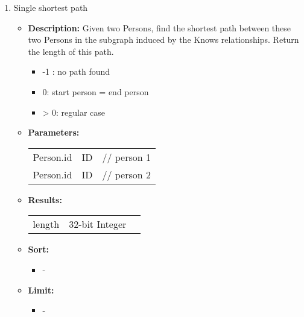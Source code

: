 {\begin{enumerate}
    \item Single shortest path
        \begin{itemize}
            \item \textbf{Description:}
                Given two Persons, find the shortest path between these two Persons in the subgraph induced by the Knows relationships.
                Return the length of this path.
                \begin{itemize}
                    \item -1 : no path found
                    \item 0: start person = end person
                    \item > 0: regular case
                \end{itemize}
            \item \textbf{Parameters:} \\
                \begin{tabular}{lll}
                    Person.id 	 			& ID & \parbox[t]{20cm}{// person 1\strut} \\
                    Person.id 	 			& ID & \parbox[t]{20cm}{// person 2\strut} \\
                \end{tabular}
            \item \textbf{Results:} \\
                \begin{tabular}{lll}
                    length 	 			& 32-bit Integer & \parbox[t]{20cm}{\par \strut} \\
                \end{tabular}
            \item \textbf{Sort:}
                  \begin{itemize}
                    \item[] -
                  \end{itemize}
            \item \textbf{Limit:}
                  \begin{itemize}
                    \item[] -
                  \end{itemize}
        \end{itemize}


\end{enumerate}}
